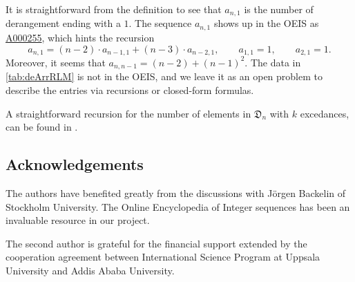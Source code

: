 \documentclass[reqno]{amsart}
\theoremstyle{definition}
\newcommand{\oeis}[1]{\href{http://oeis.org/#1}{#1}}
\newcommand{\dArr}{\mathfrak{D}}
\begin{document}
It is straightforward from the definition to see that $a_{n,1}$ is the number of derangement ending with a $1$.
The sequence $a_{n,1}$ shows up in the OEIS as \oeis{A000255}, which hints the recursion
\[
 a_{n,1} = (n-2) \cdot a_{n-1,1} + (n-3) \cdot a_{n-2,1}, \qquad a_{1,1} =1, \qquad a_{2,1} =1.
\]
Moreover, it seems that $a_{n,n-1} = (n-2) + (n-1)^2$.
The data in \cref{tab:deArrRLM} is not in the OEIS, 
and we leave it as an open problem to describe the 
entries via recursions or closed-form formulas. 

A straightforward recursion for the number of elements in $\dArr_n$ with $k$ excedances,
can be found in \cite{MantaciRakotondrajao2001}.


\subsection*{Acknowledgements}

The authors have benefited greatly from the discussions
with Jörgen Backelin of Stockholm University.
The Online Encyclopedia of Integer sequences \cite{OEIS} 
has been an invaluable resource in our project.

The second author is grateful for the financial support extended
by the cooperation agreement between International Science Program
at Uppsala University and Addis Ababa University.



% 
\end{document}
